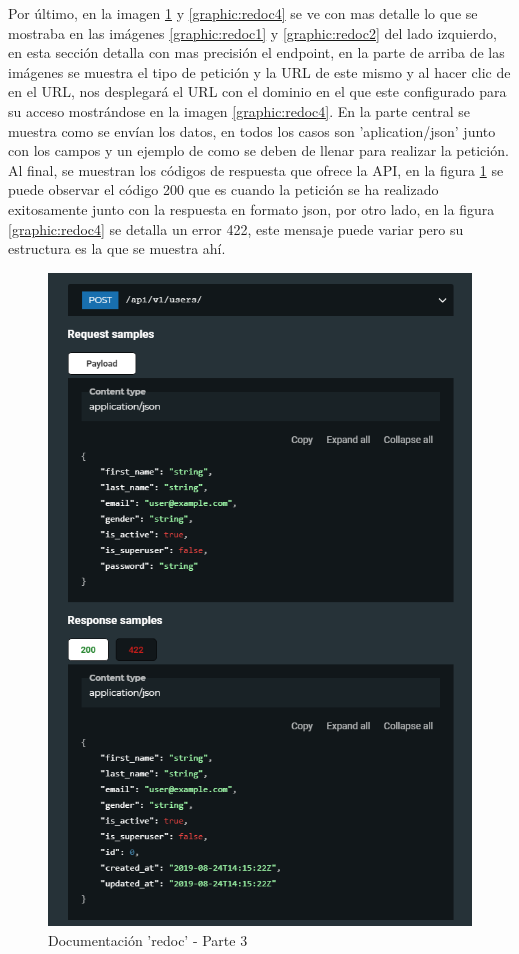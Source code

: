 Por último, en la imagen \ref{graphic:redoc3} y \ref{graphic:redoc4} se ve con mas detalle lo que se mostraba en las imágenes \ref{graphic:redoc1} y \ref{graphic:redoc2} del lado izquierdo, en esta sección detalla con mas precisión el endpoint, en la parte de arriba de las imágenes se muestra el tipo de petición y la URL de este mismo y al hacer clic de en el URL, nos desplegará el URL con el dominio en el que este configurado para su acceso mostrándose en la imagen \ref{graphic:redoc4}. En la parte central se muestra como se envían los datos, en todos los casos son 'aplication/json' junto con los campos y un ejemplo de como se deben de llenar para realizar la petición. Al final, se muestran los códigos de respuesta que ofrece la API, en la figura \ref{graphic:redoc3} se puede observar el código 200 que es cuando la petición se ha realizado exitosamente junto con la respuesta en formato json, por otro lado, en la figura \ref{graphic:redoc4} se detalla un error 422, este mensaje puede variar pero su estructura es la que se muestra ahí.

\begin{figure}[!htb]
    \centering
    \includegraphics[scale=.40]{TT/img/implementacion/redoc_3.png}
    \caption{Documentación 'redoc' - Parte 3}
    \label{graphic:redoc3}
\end{figure}

